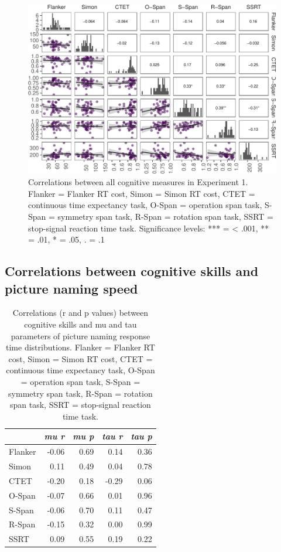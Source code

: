 \documentclass[
  man,floatsintext]{apa6}
\begin{document}
\begin{figure}
\centering
\includegraphics{task_difficulty_ind_dif_files/figure-latex/cogskillscor-1.pdf}
\caption{\label{fig:cogskillscor}Correlations between all cognitive measures in Experiment 1. Flanker = Flanker RT cost, Simon = Simon RT cost, CTET = continuous time expectancy task, O-Span = operation span task, S-Span = symmetry span task, R-Span = rotation span task, SSRT = stop-signal reaction time task. Significance levels: *** = \textless{} .001, ** = .01, * = .05, . = .1}
\end{figure}

\hypertarget{correlations-between-cognitive-skills-and-picture-naming-speed}{%
\subsection{Correlations between cognitive skills and picture naming speed}\label{correlations-between-cognitive-skills-and-picture-naming-speed}}

\begin{table}

\caption{\label{tab:cormutau}Correlations (r and p values) between cognitive skills and mu and tau parameters of picture naming response time distributions. Flanker = Flanker RT cost, Simon = Simon RT cost, CTET = continuous time expectancy task, O-Span = operation span task, S-Span = symmetry span task, R-Span = rotation span task, SSRT = stop-signal reaction time task.}
\centering
\begin{tabular}[t]{lrrrr}
\toprule
\em{ } & \em{mu r} & \em{mu p} & \em{tau r} & \em{tau p}\\
\midrule
Flanker & -0.06 & 0.69 & 0.14 & 0.36\\
Simon & 0.11 & 0.49 & 0.04 & 0.78\\
CTET & -0.20 & 0.18 & -0.29 & 0.06\\
O-Span & -0.07 & 0.66 & 0.01 & 0.96\\
S-Span & -0.06 & 0.70 & 0.11 & 0.47\\
\addlinespace
R-Span & -0.15 & 0.32 & 0.00 & 0.99\\
SSRT & 0.09 & 0.55 & 0.19 & 0.22\\
\bottomrule
\end{tabular}
\end{table}
\end{document}
